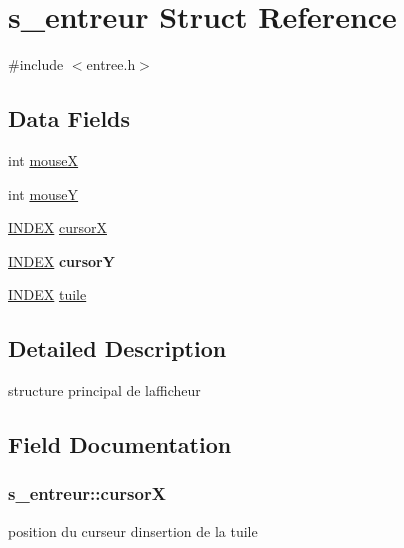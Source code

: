 \hypertarget{structs__entreur}{}\section{s\+\_\+entreur Struct Reference}
\label{structs__entreur}


{\ttfamily \#include $<$entree.\+h$>$}

\subsection*{Data Fields}
\begin{DoxyCompactItemize}
\item 
int \hyperlink{structs__entreur_a03edb5e23791633fc3082592490f2d8c}{mouseX}
\item 
int \hyperlink{structs__entreur_a883d34d553aff845ab05711cfb1fafb5}{mouseY}
\item 
\hyperlink{types_8h_ac6885dbfb371c33e523c7fb046118b36}{I\+N\+D\+EX} \hyperlink{structs__entreur_a94ae2dba6bc9a35bcb0ed8b1e3e3b305}{cursorX}
\item 
\hyperlink{types_8h_ac6885dbfb371c33e523c7fb046118b36}{I\+N\+D\+EX} {\bfseries cursorY}\hypertarget{structs__entreur_a2c038d62cd242449c00464042d42d8a9}{}\label{structs__entreur_a2c038d62cd242449c00464042d42d8a9}

\item 
\hyperlink{types_8h_ac6885dbfb371c33e523c7fb046118b36}{I\+N\+D\+EX} \hyperlink{structs__entreur_a07f9cadcea8249c14f0d0f38283e9b63}{tuile}
\end{DoxyCompactItemize}


\subsection{Detailed Description}
structure principal de l\textquotesingle{}afficheur 

\subsection{Field Documentation}
\subsubsection[{\texorpdfstring{cursorX}{cursorX}}]{ s\+\_\+entreur\+::cursorX}\hypertarget{structs__entreur_a94ae2dba6bc9a35bcb0ed8b1e3e3b305}{}\label{structs__entreur_a94ae2dba6bc9a35bcb0ed8b1e3e3b305}
position du curseur d\textquotesingle{}insertion de la tuile 
